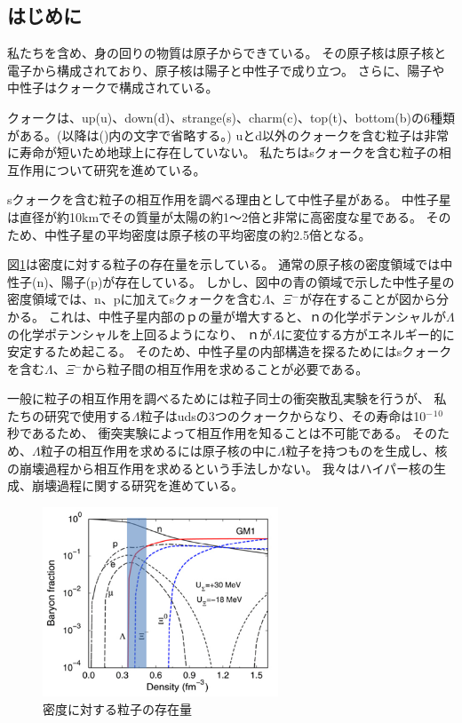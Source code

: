 \documentclass[12pt,a4paper]{jarticle}
\begin{document}
\subsection{はじめに}
私たちを含め、身の回りの物質は原子からできている。
その原子核は原子核と電子から構成されており、原子核は陽子と中性子で成り立つ。
さらに、陽子や中性子はクォークで構成されている。
\par
クォークは、up(u)、down(d)、strange(s)、charm(c)、top(t)、bottom(b)の6種類がある。(以降は()内の文字で省略する。)
uとd以外のクォークを含む粒子は非常に寿命が短いため地球上に存在していない。
私たちはsクォークを含む粒子の相互作用について研究を進めている。
\par
sクォークを含む粒子の相互作用を調べる理由として中性子星がある。
中性子星は直径が約10kmでその質量が太陽の約1～2倍と非常に高密度な星である。
そのため、中性子星の平均密度は原子核の平均密度の約2.5倍となる。
\par
図\ref{fig:den_barion}は密度に対する粒子の存在量を示している。
通常の原子核の密度領域では中性子(n)、陽子(p)が存在している。
しかし、図中の青の領域で示した中性子星の密度領域では、n、pに加えてsクォークを含む$\Lambda$、$\Xi$$^-$が存在することが図から分かる。
これは、中性子星内部のｐの量が増大すると、ｎの化学ポテンシャルが$\Lambda$の化学ポテンシャルを上回るようになり、
ｎが$\Lambda$に変位する方がエネルギー的に安定するため起こる。
そのため、中性子星の内部構造を探るためにはsクォークを含む$\Lambda$、$\Xi$$^-$から粒子間の相互作用を求めることが必要である。
\par
一般に粒子の相互作用を調べるためには粒子同士の衝突散乱実験を行うが、
私たちの研究で使用する$\Lambda$粒子はudsの3つのクォークからなり、その寿命は10$^-$$^1$$^0$秒であるため、
衝突実験によって相互作用を知ることは不可能である。
そのため、$\Lambda$粒子の相互作用を求めるには原子核の中に$\Lambda$粒子を持つものを生成し、核の崩壊過程から相互作用を求めるという手法しかない。
我々はハイパー核の生成、崩壊過程に関する研究を進めている。
\begin{figure}[htbp]
  \centering
   \includegraphics[width=70mm]{den_barion.png}
  \caption{密度に対する粒子の存在量\label{fig:den_barion}}
\end{figure}
\end{document}
